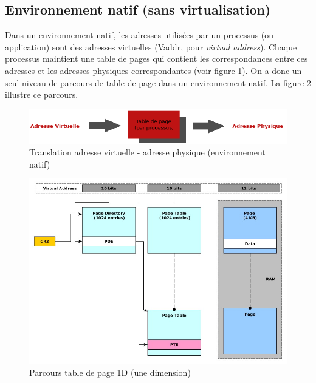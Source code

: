 \subsection{Environnement natif (sans virtualisation)}
Dans un environnement natif, les adresses utilisées par un processus (ou application) sont des adresses virtuelles (Vaddr, pour \textit{virtual address}). Chaque processus maintient une table de pages qui contient les correspondances entre ces adresses et les adresses physiques correspondantes (voir figure \ref{fig:vaddr_paddr_natif}). On a donc un seul niveau de parcours de table de page dans un environnement natif. La figure \ref{fig:parcours_1D} illustre ce parcours.
\begin{figure}[htp]
    \centering
    \includegraphics[width=1\linewidth]{chapters/1/fig1/vaddr_paddr}
    \caption{Translation adresse virtuelle - adresse physique (environnement natif)}
    \label{fig:vaddr_paddr_natif}
\end{figure}

\begin{figure}[htp]
    \centering
    \includegraphics[width=1\linewidth]{chapters/1/fig1/parcours_1D}
    \caption{Parcours table de page 1D (une dimension)}
    \label{fig:parcours_1D}
\end{figure}


